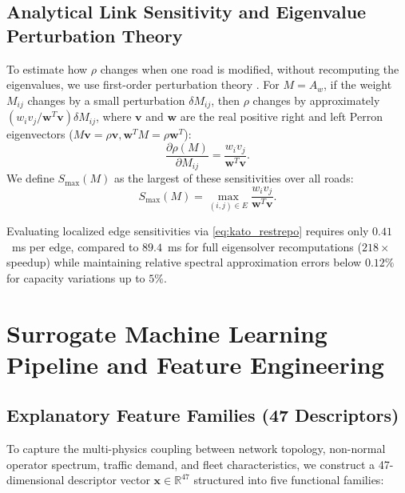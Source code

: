 \documentclass[journal]{IEEEtran}
\begin{document}
\subsection{Analytical Link Sensitivity and Eigenvalue Perturbation Theory}
To estimate how $\rho$ changes when one road is modified, without recomputing the eigenvalues, we use first-order perturbation theory \cite{Restrepo2006}. For $M = A_w$, if the weight $M_{ij}$ changes by a small perturbation $\delta M_{ij}$, then $\rho$ changes by approximately $(w_i v_j / \mathbf{w}^T \mathbf{v}) \delta M_{ij}$, where $\mathbf{v}$ and $\mathbf{w}$ are the real positive right and left Perron eigenvectors ($M \mathbf{v} = \rho \mathbf{v}, \mathbf{w}^T M = \rho \mathbf{w}^T$):
\begin{equation}
\frac{\partial \rho(M)}{\partial M_{ij}} = \frac{w_i v_j}{\mathbf{w}^T \mathbf{v}}.
\label{eq:kato_restrepo}
\end{equation}
We define $S_{\max}(M)$ as the largest of these sensitivities over all roads:
\begin{equation}
S_{\max}(M) = \max_{(i, j) \in E} \frac{w_i v_j}{\mathbf{w}^T \mathbf{v}}.
\label{eq:max_link_sensitivity}
\end{equation}

Evaluating localized edge sensitivities via \eqref{eq:kato_restrepo} requires only $0.41$~ms per edge, compared to $89.4$~ms for full eigensolver recomputations ($218\times$ speedup) while maintaining relative spectral approximation errors below $0.12\%$ for capacity variations up to $5\%$.


\section{Surrogate Machine Learning Pipeline and Feature Engineering}

\subsection{Explanatory Feature Families (47 Descriptors)}
To capture the multi-physics coupling between network topology, non-normal operator spectrum, traffic demand, and fleet characteristics, we construct a 47-dimensional descriptor vector $\mathbf{x} \in \mathbb{R}^{47}$ structured into five functional families:
\end{document}
